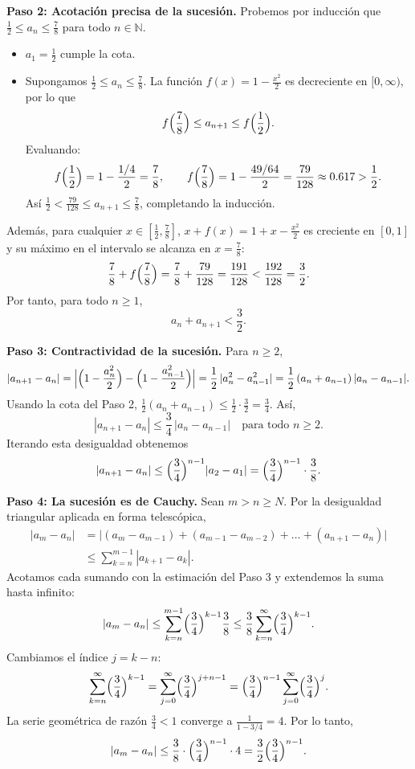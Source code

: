 \begin{example}
\begin{myproof}
\textbf{Paso 2: Acotación precisa de la sucesión.}
Probemos por inducción que $\frac{1}{2} \le a_n \le \frac{7}{8}$ para todo $n \in \mathbb{N}$.
\begin{itemize}
  \item $a_1 = \frac{1}{2}$ cumple la cota.
  \item Supongamos $\frac{1}{2} \le a_n \le \frac{7}{8}$.
  La función $f(x) = 1 - \frac{x^2}{2}$ es decreciente en $[0,\infty)$,
  por lo que
  \[
  f\Bigl(\frac{7}{8}\Bigr) \le a_{n+1} \le f\Bigl(\frac{1}{2}\Bigr).
  \]
  Evaluando:
  \[
  f\Bigl(\frac{1}{2}\Bigr) = 1 - \frac{1/4}{2} = \frac{7}{8},
  \qquad
  f\Bigl(\frac{7}{8}\Bigr) = 1 - \frac{49/64}{2} = \frac{79}{128} \approx 0.617 > \frac{1}{2}.
  \]
  Así $\frac{1}{2} < \frac{79}{128} \le a_{n+1} \le \frac{7}{8}$,
  completando la inducción.
\end{itemize}
Además, para cualquier $x \in [\frac{1}{2}, \frac{7}{8}]$,
$x + f(x) = 1 + x - \frac{x^2}{2}$ es creciente en $[0,1]$ y su máximo
en el intervalo se alcanza en $x = \frac{7}{8}$:
\[
\frac{7}{8} + f\Bigl(\frac{7}{8}\Bigr) = \frac{7}{8} + \frac{79}{128}
= \frac{191}{128} < \frac{192}{128} = \frac{3}{2}.
\]
Por tanto, para todo $n \ge 1$,
\[
a_n + a_{n+1} < \frac{3}{2}.
\]

\textbf{Paso 3: Contractividad de la sucesión.}
Para $n \ge 2$,
\[
|a_{n+1} - a_n|
= \Bigl| \Bigl(1 - \frac{a_n^2}{2}\Bigr) - \Bigl(1 - \frac{a_{n-1}^2}{2}\Bigr) \Bigr|
= \frac{1}{2}\,|a_n^2 - a_{n-1}^2|
= \frac{1}{2}\,(a_n + a_{n-1})\,|a_n - a_{n-1}|.
\]
Usando la cota del Paso 2, $\frac{1}{2}(a_n + a_{n-1}) \le \frac{1}{2}\cdot\frac{3}{2} = \frac{3}{4}$.
Así,
\[
|a_{n+1} - a_n| \le \frac{3}{4}\,|a_n - a_{n-1}| \quad \text{para todo } n \ge 2.
\]
Iterando esta desigualdad obtenemos
\[
|a_{n+1} - a_n|
\le \Bigl(\frac{3}{4}\Bigr)^{n-1} |a_2 - a_1|
= \Bigl(\frac{3}{4}\Bigr)^{n-1} \cdot \frac{3}{8}.
\]

\textbf{Paso 4: La sucesión es de Cauchy.}
Sean $m > n \ge N$. Por la desigualdad triangular aplicada en forma telescópica,
\begin{align*}
|a_m - a_n|
&= \bigl| (a_m - a_{m-1}) + (a_{m-1} - a_{m-2}) + \dots + (a_{n+1} - a_n) \bigr| \\
&\le \sum_{k=n}^{m-1} |a_{k+1} - a_k|.
\end{align*}
Acotamos cada sumando con la estimación del Paso 3 y extendemos la suma hasta infinito:
\[
|a_m - a_n|
\le \sum_{k=n}^{m-1} \Bigl(\frac{3}{4}\Bigr)^{k-1} \frac{3}{8}
\le \frac{3}{8} \sum_{k=n}^{\infty} \Bigl(\frac{3}{4}\Bigr)^{k-1}.
\]
Cambiamos el índice $j = k-n$:
\[
\sum_{k=n}^{\infty} \Bigl(\frac{3}{4}\Bigr)^{k-1}
= \sum_{j=0}^{\infty} \Bigl(\frac{3}{4}\Bigr)^{j+n-1}
= \Bigl(\frac{3}{4}\Bigr)^{n-1} \sum_{j=0}^{\infty} \Bigl(\frac{3}{4}\Bigr)^{j}.
\]
La serie geométrica de razón $\frac{3}{4}<1$ converge a $\frac{1}{1-3/4}=4$.
Por lo tanto,
\[
|a_m - a_n|
\le \frac{3}{8} \cdot \Bigl(\frac{3}{4}\Bigr)^{n-1} \cdot 4
= \frac{3}{2} \Bigl(\frac{3}{4}\Bigr)^{n-1}.
\]


\end{myproof}
\end{example}
